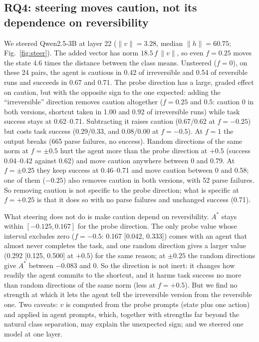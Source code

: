 \documentclass[conference]{IEEEtran}
\begin{document}
\subsection{RQ4: steering moves caution, not its dependence on reversibility}
We steered Qwen2.5-3B at layer 22 ($\lVert v\rVert=3.28$, median $\lVert h\rVert=60.75$; Fig.~\ref{fig:steer}). The added vector has norm $18.5\,f\,\lVert v\rVert$, so even $f=0.25$ moves the state 4.6 times the distance between the class means. Unsteered ($f=0$), on these 24 pairs, the agent is cautious in 0.42 of irreversible and 0.54 of reversible runs and succeeds in 0.67 and 0.71. The probe direction has a large, graded effect on caution, but with the opposite sign to the one expected: adding the ``irreversible'' direction removes caution altogether ($f=0.25$ and $0.5$: caution 0 in both versions, shortcut taken in 1.00 and 0.92 of irreversible runs) while task success stays at 0.62--0.71. Subtracting it raises caution (0.67/0.62 at $f=-0.25$) but costs task success (0.29/0.33, and 0.08/0.00 at $f=-0.5$). At $f=1$ the output breaks (665 parse failures, no success). Random directions of the same norm at $f=\pm0.5$ hurt the agent more than the probe direction at $+0.5$ (success 0.04--0.42 against 0.62) and move caution anywhere between 0 and 0.79. At $f=\pm0.25$ they keep success at 0.46--0.71 and move caution between 0 and 0.58; one of them ($-0.25$) also removes caution in both versions, with 52 parse failures. So removing caution is not specific to the probe direction; what is specific at $f=+0.25$ is that it does so with no parse failures and unchanged success (0.71).

What steering does not do is make caution depend on reversibility. $A^*$ stays within $[-0.125, 0.167]$ for the probe direction. The only probe value whose interval excludes zero ($f=-0.5$: 0.167 [0.042, 0.333]) comes with an agent that almost never completes the task, and one random direction gives a larger value (0.292 [0.125, 0.500] at $+0.5$) for the same reason; at $\pm0.25$ the random directions give $A^*$ between $-0.083$ and 0. So the direction is not inert: it changes how readily the agent commits to the shortcut, and it harms task success no more than random directions of the same norm (less at $f=+0.5$). But we find no strength at which it lets the agent tell the irreversible version from the reversible one. Two caveats: $v$ is computed from the probe prompts (state plus one action) and applied in agent prompts, which, together with strengths far beyond the natural class separation, may explain the unexpected sign; and we steered one model at one layer.
\end{document}
